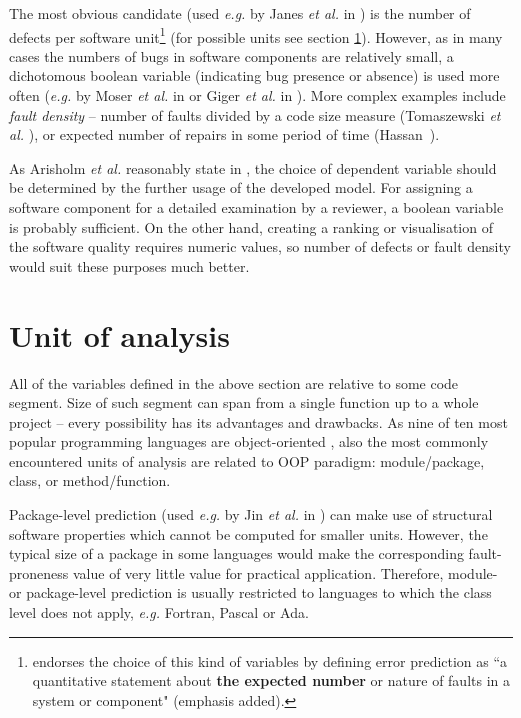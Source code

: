 \documentclass{pracamgr}
\begin{document}
The most obvious candidate (used \textit{e.g.} by Janes \textit{et al.} in \cite{Janes}) is the number of defects per software unit\footnote{\cite[p. 31]{glossary} endorses the choice of this kind of variables by defining error prediction as ``a quantitative statement about \textbf{the expected number} or nature of faults in a system or component" (emphasis added).} (for possible units see section \ref{sec:unit_of_analysis}). However, as in many cases the numbers of bugs in software components are relatively small, a dichotomous boolean variable (indicating bug presence or absence) is used more often (\textit{e.g.} by Moser \textit{et al.} in \cite{comparative} or Giger \textit{et al.} in \cite{method-level}). More complex examples include \emph{fault density} -- number of faults divided by a code size measure (Tomaszewski \textit{et al.} \cite{Tomaszewski}), or expected number of repairs in some period of time (Hassan~\cite{complexity}).

As Arisholm \textit{et al.} reasonably state in \cite[p. 5]{systematic}, the choice of dependent variable should be determined by the further usage of the developed model. For assigning a software component for a detailed examination by a reviewer, a boolean variable is probably sufficient. On the other hand, creating a ranking or visualisation of the software quality requires numeric values, so number of defects or fault density would suit these purposes much better.

\section{Unit of analysis}
\label{sec:unit_of_analysis}
All of the variables defined in the above section are relative to some code segment. Size of such segment can span from a single function up to a whole project -- every possibility has its advantages and drawbacks. As nine of ten most popular programming languages are object-oriented \cite{popularity1,popularity2}, also the most commonly encountered units of analysis are related to OOP paradigm: module/package, class, or method/function.

Package-level prediction (used \textit{e.g.} by Jin \textit{et al.} in \cite{Jin}) can make use of structural software properties which cannot be computed for smaller units. However, the typical size of a package in some languages would make the corresponding fault-proneness value of very little value for practical application. Therefore, module- or package-level prediction is usually restricted to languages to which the class level does not apply, \textit{e.g.} Fortran, Pascal or Ada.
\end{document}

